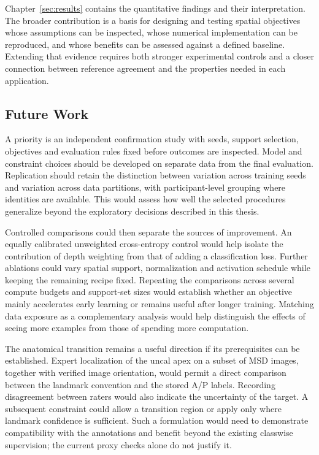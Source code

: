 \documentclass[12pt,a4paper]{article}
\begin{document}
Chapter~\ref{sec:results} contains the quantitative findings and their
interpretation. The broader contribution is a basis for designing and
testing spatial objectives whose assumptions can be inspected, whose
numerical implementation can be reproduced, and whose benefits can be
assessed against a defined baseline. Extending that evidence requires
both stronger experimental controls and a closer connection between
reference agreement and the properties needed in each application.

\subsection{Future Work}\label{sec:future-work}
\label{sec:pending-results}

A priority is an independent confirmation study with seeds, support
selection, objectives and evaluation rules fixed before outcomes are
inspected. Model and constraint choices should be developed on separate
data from the final evaluation. Replication should retain the distinction
between variation across training seeds and variation across data
partitions, with participant-level grouping where identities are
available. This would assess how well the selected procedures generalize
beyond the exploratory decisions described in this thesis.

Controlled comparisons could then separate the sources of improvement.
An equally calibrated unweighted cross-entropy control would help
isolate the contribution of depth weighting from that of adding a
classification loss. Further ablations could vary spatial support,
normalization and activation schedule while keeping the remaining recipe
fixed. Repeating the comparisons across several compute budgets and
support-set sizes would establish whether an objective mainly accelerates
early learning or remains useful after longer training. Matching data
exposure as a complementary analysis would help distinguish the effects
of seeing more examples from those of spending more computation.

The anatomical transition remains a useful direction if its prerequisites
can be established. Expert localization of the uncal apex on a subset
of MSD images, together with verified image orientation, would permit
a direct comparison between the landmark convention and the stored A/P
labels. Recording disagreement between raters would also indicate the
uncertainty of the target. A subsequent constraint could allow a
transition region or apply only where landmark confidence is sufficient.
Such a formulation would need to demonstrate compatibility with the
annotations and benefit beyond the existing classwise supervision;
the current proxy checks alone do not justify it.
\end{document}
